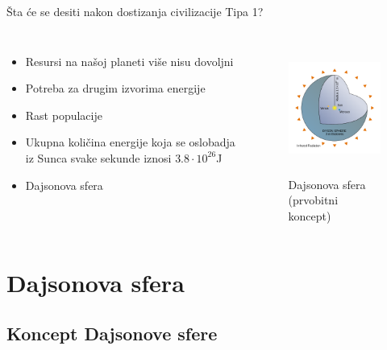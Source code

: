 \documentclass[13pt]{beamer}
\begin{document}
\begin{frame}{Šta će se desiti nakon dostizanja civilizacije Tipa 1?}


\begin{columns}
        \begin{itemize}
        \item Resursi na našoj planeti više nisu dovoljni
        \item Potreba za drugim izvorima energije
        \item Rast populacije
        \item Ukupna količina energije koja se oslobadja iz Sunca svake sekunde iznosi $3.8 \cdot 10^{26} $J


        \item Dajsonova sfera 
        \end{itemize}
            \begin{figure}
                \centering
                \includegraphics[width=4.5cm, height=4.3cm]{images/Dajsonova sfera.png}
                \caption{Dajsonova sfera (prvobitni koncept)}
            \end{figure}
\end{columns}

\end{frame}






\section{Dajsonova sfera}

\subsection{Koncept Dajsonove sfere}
\end{document}
